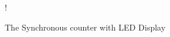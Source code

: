 \documentclass[journal,12pt,twocolumn]{IEEEtran}
\begin{document}
\begin{enumerate}[1.]
\begin{figure}[!h]
	\begin{center}
\resizebox {\columnwidth} {!} {
  
}
\end{center}
\caption{The Synchronous counter with LED Display}
\vspace{128in}
\label{fig:dec_counter}
\end{figure}

\end{enumerate}



	
	
	
%		

\end{document}
